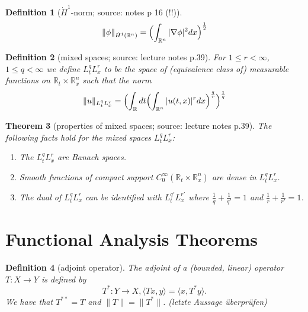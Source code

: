 \documentclass[12pt,a4paper]{article}
\newtheorem{definition}{Definition}
\newtheorem{thm}[definition]{Theorem}
\newcommand{\Rn}{\mathbb{R}^n}
\begin{document}
\begin{definition}[$\dot H^1$-norm; source: notes p 16 (!!)]
\begin{equation}
\lVert \phi \rVert_{\dot H^1(\Rn)} = \Bigl(\int_{\Rn} \vert \nabla \phi \vert^2dx \Bigr)^{\frac{1}{2}}
\end{equation}
\end{definition}

\begin{definition}[mixed spaces; source: lecture notes p.39]
For $1 \leq r < \infty$, $1 \leq q < \infty$ we define $L_t^qL_x^r$ to be the space of (equivalence class of) measurable functions on $\mathbb{R}_t \times \Rn_x$ such that the norm
\begin{equation}
\lVert u \rVert_{L_t^qL_x^r} = \Bigl( \int_{\mathbb{R}} dt \Bigl( \int_{\Rn} \vert u(t,x) \vert^r dx \Bigr)^{\frac{q}{r}} \Bigr)^{\frac{1}{q}} 
\end{equation}
\end{definition}

\begin{thm}[properties of mixed spaces; source: lecture notes p.39]
The following facts hold for the mixed spaces $L_t^qL_x^r$:
\begin{enumerate}
\item The $L_t^qL_x^r$ are Banach spaces. \\
\item Smooth functions of compact support $C_0^{\infty}(\mathbb{R}_t \times \Rn_x)$ are dense in $L_t^qL_x^r$. \\
\item The dual of $L_t^qL_x^r$ can be identified with $L_t^{q'}L_x^{r'}$ where $\frac{1}{q}+\frac{1}{q'}=1$ and $\frac{1}{r}+\frac{1}{r'}=1$.
\end{enumerate}
\end{thm}

\section{Functional Analysis Theorems}

\begin{definition}[adjoint operator]
The adjoint of a (bounded, linear) operator $T:X\rightarrow Y$ is defined by
\begin{equation}
T^*:Y\rightarrow X, \langle Tx, y \rangle = \langle x, T^*y \rangle.
\end{equation}
We have that $T^{**}=T$ and $\lVert T \rVert = \lVert T^* \rVert$. (letzte Aussage überprüfen)
\end{definition}
\end{document}
